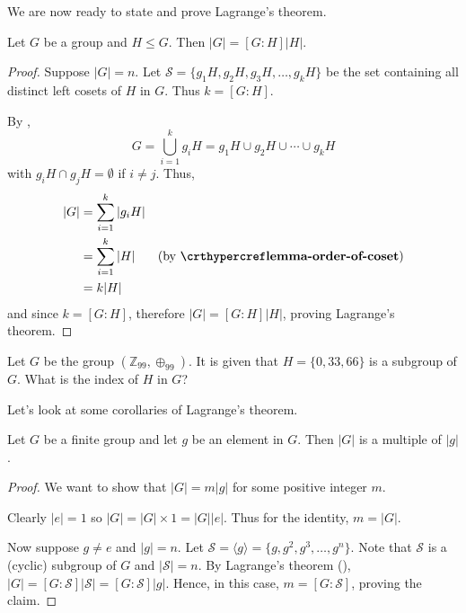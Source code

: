 We are now ready to state and prove Lagrange's theorem.
\begin{theorem}[Lagrange]\label{thrm-lagrange}
    Let $G$ be a group and $H \leq G$. Then $|G| = [G:H]|H|$.
\end{theorem}
\begin{proof}
    Suppose $|G| = n$. Let $\mathcal{S} = \{g_1H, g_2H, g_3H, \dots, g_kH\}$ be the set containing all distinct left cosets of $H$ in $G$. Thus $k = [G: H]$.

    By ,
    \[
        G = \bigcup_{i=1}^k g_iH = g_1H \cup g_2H \cup \cdots \cup g_kH
    \]
    with $g_iH \cap g_jH = \emptyset$ if $i \neq j$. Thus,
    \begin{align*}
        |G| &= \sum_{i=1}^k|g_iH|\\
        &=\sum_{i=1}^k|H| & (\text{by \myref{lemma-order-of-coset}})\\
        &= k|H|
    \end{align*}
    and since $k = [G: H]$, therefore $|G| = [G:H]|H|$, proving Lagrange's theorem.
\end{proof}

\begin{exercise}
    Let $G$ be the group $(\mathbb{Z}_{99}, \oplus_{99})$. It is given that $H = \{0, 33, 66\}$ is a subgroup of $G$. What is the index of $H$ in $G$?
\end{exercise}

Let's look at some corollaries of Lagrange's theorem.
\begin{corollary}\label{corollary-order-of-group-multiple-of-order-of-element}
    Let $G$ be a finite group and let $g$ be an element in $G$. Then $|G|$ is a multiple of $|g|$.
\end{corollary}
\begin{proof}
    We want to show that $|G| = m|g|$ for some positive integer $m$.

    Clearly $|e| = 1$ so $|G| = |G| \times 1 = |G||e|$. Thus for the identity, $m = |G|$.

    Now suppose $g \neq e$ and $|g| = n$. Let $\mathcal{S} = \langle g \rangle = \{g, g^2, g^3, \dots, g^n\}$. Note that $\mathcal{S}$ is a (cyclic) subgroup of $G$ and $|\mathcal{S}| = n$. By Lagrange's theorem (), $|G| = [G:\mathcal{S}]|\mathcal{S}| = [G:\mathcal{S}]|g|$. Hence, in this case, $m = [G:\mathcal{S}]$, proving the claim.
\end{proof}

